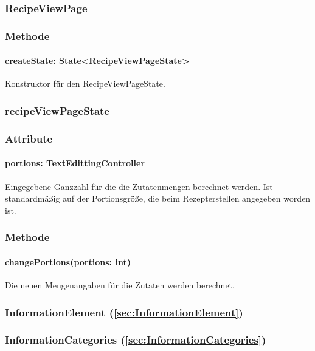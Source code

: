 \documentclass[parskip=full]{scrartcl}
\begin{document}
\subsubsection{RecipeViewPage}
\subsubsection*{Methode}
\paragraph*{createState: State<RecipeViewPageState>} Konstruktor für den RecipeViewPageState.

\subsubsection{recipeViewPageState}
\subsubsection*{Attribute}
\paragraph*{portions: TextEdittingController} Eingegebene Ganzzahl für die die Zutatenmengen berechnet werden. Ist standardmäßig auf der Portionsgröße, die beim Rezepterstellen angegeben worden ist.

\subsubsection*{Methode}
\paragraph*{changePortions(portions: int)} Die neuen Mengenangaben für die Zutaten werden berechnet.

\subsubsection*{InformationElement (\ref{sec:InformationElement})}

\subsubsection{InformationCategories (\ref{sec:InformationCategories})}
\end{document}
